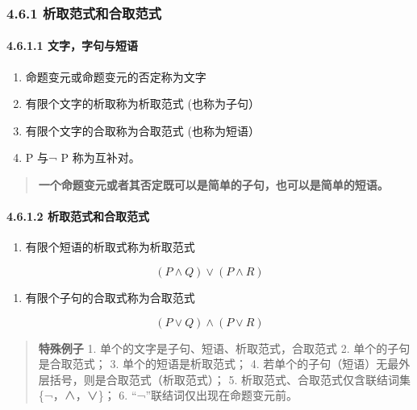 \subsubsection{4.6.1
析取范式和合取范式}\label{ux6790ux53d6ux8303ux5f0fux548cux5408ux53d6ux8303ux5f0f}

\paragraph{4.6.1.1
文字，字句与短语}\label{ux6587ux5b57ux5b57ux53e5ux4e0eux77edux8bed}

\begin{enumerate}
\def\labelenumi{\arabic{enumi})}
\tightlist
\item
  命题变元或命题变元的否定称为文字
\item
  有限个文字的析取称为析取范式 (也称为子句）
\item
  有限个文字的合取称为合取范式 (也称为短语）
\item
  P 与¬ P 称为互补对。
\end{enumerate}

\begin{quote}
\textbf{一个命题变元或者其否定既可以是简单的子句，也可以是简单的短语。}
\end{quote}

\paragraph{4.6.1.2
析取范式和合取范式}\label{ux6790ux53d6ux8303ux5f0fux548cux5408ux53d6ux8303ux5f0f-1}

\begin{enumerate}
\def\labelenumi{\arabic{enumi})}
\tightlist
\item
  有限个短语的析取式称为析取范式
\end{enumerate}

\[
(P \land Q)\lor(P \land R) 
\]

\begin{enumerate}
\def\labelenumi{\arabic{enumi})}
\setcounter{enumi}{1}
\tightlist
\item
  有限个子句的合取式称为合取范式
\end{enumerate}

\[
(P \lor Q)\land(P \lor R)
\]

\begin{quote}
\textbf{特殊例子} 1. 单个的文字是子句、短语、析取范式，合取范式 2.
单个的子句是合取范式； 3. 单个的短语是析取范式； 4.
若单个的子句（短语）无最外层括号，则是合取范式（析取范式）； 5.
析取范式、合取范式仅含联结词集\{¬，∧，∨\}； 6.
``¬''联结词仅出现在命题变元前。
\end{quote}

